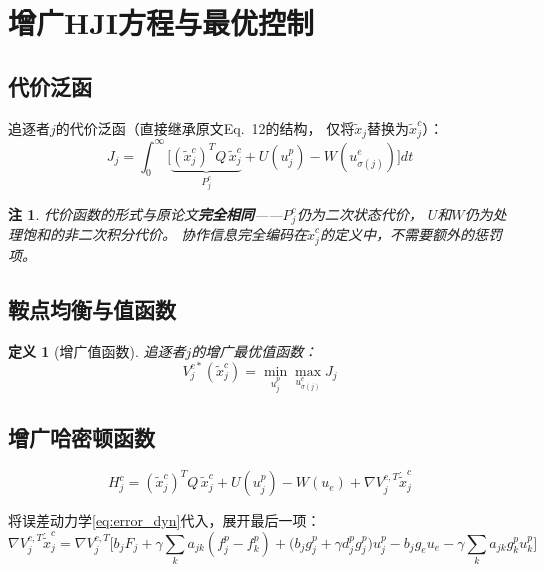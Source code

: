 \documentclass[11pt,a4paper]{article}
\newtheorem{definition}{定义}
\newtheorem{remark}{注}
\begin{document}
\section{增广HJI方程与最优控制}

\subsection{代价泛函}

追逐者$j$的代价泛函（直接继承原文Eq.~12的结构，
仅将$\tilde{x}_j$替换为$\tilde{x}_j^c$）：
\begin{equation}\label{eq:cost}
  J_j = \int_0^\infty \Big[
    \underbrace{(\tilde{x}_j^c)^T Q\, \tilde{x}_j^c}_{P_j^c}
    + U(u_j^p) - W(u_{\sigma(j)}^e)
  \Big] dt
\end{equation}

\begin{remark}
  代价函数的形式与原论文\textbf{完全相同}——$P_j^c$仍为二次状态代价，
  $U$和$W$仍为处理饱和的非二次积分代价。
  协作信息完全编码在$\tilde{x}_j^c$的定义中，不需要额外的惩罚项。
\end{remark}

\subsection{鞍点均衡与值函数}

\begin{definition}[增广值函数]
  追逐者$j$的增广最优值函数：
  \begin{equation}\label{eq:V_aug}
    V_j^{c*}(\tilde{x}_j^c) =
    \min_{u_j^p} \max_{u_{\sigma(j)}^e} J_j
  \end{equation}
\end{definition}

\subsection{增广哈密顿函数}

\begin{equation}\label{eq:H_aug}
  \boxed{
  H_j^c = (\tilde{x}_j^c)^T Q\, \tilde{x}_j^c
  + U(u_j^p) - W(u_e)
  + \nabla V_j^{c,T} \dot{\tilde{x}}_j^c
  }
\end{equation}

将误差动力学\eqref{eq:error_dyn}代入，展开最后一项：
\begin{equation}\label{eq:H_expand}
  \nabla V_j^{c,T} \dot{\tilde{x}}_j^c
  = \nabla V_j^{c,T} \Big[
    b_j F_j
    + \gamma \textstyle\sum_k a_{jk}(f_j^p - f_k^p)
    + \big(b_j g_j^p + \gamma d_j^p g_j^p\big) u_j^p
    - b_j g_e u_e
    - \gamma \textstyle\sum_k a_{jk} g_k^p u_k^p
  \Big]
\end{equation}
\end{document}
